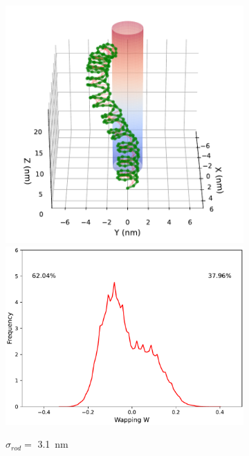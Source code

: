 \documentclass[a4paper,10pt]{article}
\begin{document}
\begin{figure}[tb]
\begin{subfigure}{.3\textwidth}
\includegraphics[width=\textwidth]{r2_B_2000000.pdf}
\includegraphics[width=\textwidth]{r2_B_wr_pr.pdf}
\caption{$\sigma_{rod}=$ \SI{3.1}{\nm}}
\label{fig:r2_b}
\end{subfigure}
\begin{subfigure}{.3\textwidth}

\end{subfigure}
\end{figure}
\end{document}
